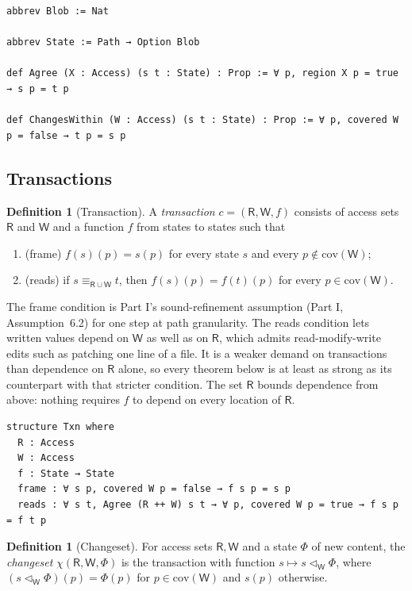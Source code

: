 \documentclass[11pt,letterpaper]{article}
\theoremstyle{definition}
\newtheorem{definition}[theorem]{Definition}
\theoremstyle{remark}
\newcommand{\R}{\mathsf{R}}
\newcommand{\W}{\mathsf{W}}
\newcommand{\op}[1]{\mathrm{#1}}
\newcommand{\covd}{\op{cov}}
\begin{document}
\begin{lstlisting}[language=Lean,caption={States, agreement and the write frame (\texttt{YonedaTx/State.lean})},label={lst:mcbl:state}]
abbrev Blob := Nat

abbrev State := Path → Option Blob

def Agree (X : Access) (s t : State) : Prop := ∀ p, region X p = true → s p = t p

def ChangesWithin (W : Access) (s t : State) : Prop := ∀ p, covered W p = false → t p = s p
\end{lstlisting}

\subsection{Transactions}

\begin{definition}[Transaction]
\label{def:mcbl:txn}
A \emph{transaction} $c=(\R,\W,f)$ consists of access sets $\R$ and $\W$ and a function $f$ from states to states such that
\begin{enumerate}
\item (frame) $f(s)(p)=s(p)$ for every state $s$ and every $p\notin\covd(\W)$;
\item (reads) if $s\equiv_{\R\cup\W}t$, then $f(s)(p)=f(t)(p)$ for every $p\in\covd(\W)$.
\end{enumerate}
\end{definition}

The frame condition is Part I's sound-refinement assumption (Part I, Assumption~6.2) for one step at path granularity. The reads condition lets written values depend on $\W$ as well as on $\R$, which admits read-modify-write edits such as patching one line of a file. It is a weaker demand on transactions than dependence on $\R$ alone, so every theorem below is at least as strong as its counterpart with that stricter condition. The set $\R$ bounds dependence from above: nothing requires $f$ to depend on every location of $\R$.

\begin{lstlisting}[language=Lean,caption={Transactions (\texttt{YonedaTx/State.lean})},label={lst:mcbl:txn}]
structure Txn where
  R : Access
  W : Access
  f : State → State
  frame : ∀ s p, covered W p = false → f s p = s p
  reads : ∀ s t, Agree (R ++ W) s t → ∀ p, covered W p = true → f s p = f t p
\end{lstlisting}

\begin{definition}[Changeset]
\label{def:mcbl:changeset}
For access sets $\R,\W$ and a state $\Phi$ of new content, the \emph{changeset} $\chi(\R,\W,\Phi)$ is the transaction with function $s\mapsto s\triangleleft_{\W}\Phi$, where $(s\triangleleft_{\W}\Phi)(p)=\Phi(p)$ for $p\in\covd(\W)$ and $s(p)$ otherwise.
\end{definition}
\end{document}
